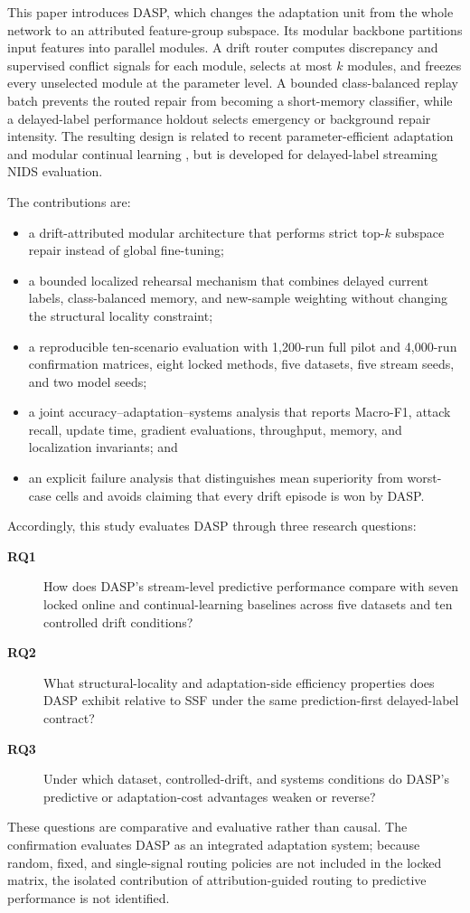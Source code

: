 \documentclass{ieeeaccess}
\begin{document}
This paper introduces DASP, which changes the adaptation unit from the whole network to an attributed feature-group subspace. Its modular backbone partitions input features into parallel modules. A drift router computes discrepancy and supervised conflict signals for each module, selects at most $k$ modules, and freezes every unselected module at the parameter level. A bounded class-balanced replay batch prevents the routed repair from becoming a short-memory classifier, while a delayed-label performance holdout selects emergency or background repair intensity. The resulting design is related to recent parameter-efficient adaptation \cite{Pfeiffer2020AdapterFusion,Hu2022LoRA,He2022DyLoRA} and modular continual learning \cite{Wang2024ContinualSurvey}, but is developed for delayed-label streaming NIDS evaluation.

The contributions are:
\begin{itemize}
    \item a drift-attributed modular architecture that performs strict top-$k$ subspace repair instead of global fine-tuning;
    \item a bounded localized rehearsal mechanism that combines delayed current labels, class-balanced memory, and new-sample weighting without changing the structural locality constraint;
    \item a reproducible ten-scenario evaluation with 1,200-run full pilot and 4,000-run confirmation matrices, eight locked methods, five datasets, five stream seeds, and two model seeds;
    \item a joint accuracy--adaptation--systems analysis that reports Macro-F1, attack recall, update time, gradient evaluations, throughput, memory, and localization invariants; and
    \item an explicit failure analysis that distinguishes mean superiority from worst-case cells and avoids claiming that every drift episode is won by DASP.
\end{itemize}

Accordingly, this study evaluates DASP through three research questions:
\begin{description}
    \item[\textbf{RQ1}] How does DASP's stream-level predictive performance compare with seven locked online and continual-learning baselines across five datasets and ten controlled drift conditions?
    \item[\textbf{RQ2}] What structural-locality and adaptation-side efficiency properties does DASP exhibit relative to SSF under the same prediction-first delayed-label contract?
    \item[\textbf{RQ3}] Under which dataset, controlled-drift, and systems conditions do DASP's predictive or adaptation-cost advantages weaken or reverse?
\end{description}
These questions are comparative and evaluative rather than causal. The confirmation evaluates DASP as an integrated adaptation system; because random, fixed, and single-signal routing policies are not included in the locked matrix, the isolated contribution of attribution-guided routing to predictive performance is not identified.
\end{document}
